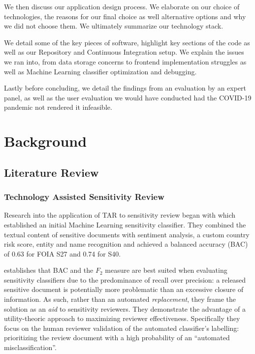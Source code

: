 \documentclass[\version]{l4proj}
\begin{document}
We then discuss our application design process. We elaborate on our choice of technologies, the reasons for our final choice as well alternative options and why we did not choose them. We ultimately summarize our technology stack.

We detail some of the key pieces of software, highlight key sections of the code as well as our Repository and Continuous Integration setup.
We explain the issues we ran into, from data storage concerns to frontend implementation struggles as well as Machine Learning classifier optimization and debugging.

Lastly before concluding, we detail the findings from an evaluation by an expert panel, as well as the user evaluation we would have conducted had the COVID-19 pandemic not rendered it infeasible.


\chapter{Background}

\section{Literature Review}

\subsection{Technology Assisted Sensitivity Review}

\autocite{sanchezDetectingSensitiveInformation2012}

Research into the application of TAR to sensitivity review began with \textcite{mcdonaldClassifierDigitalSensitivity2014} which established an initial Machine Learning sensitivity classifier.
They combined the textual content of sensitive documents with sentiment analysis, a custom country risk score, entity and name recognition and achieved a balanced accuracy (BAC) of 0.63 for FOIA S27 and 0.74 for S40.

\textcite{berardiSemiAutomatedTextClassification2015} establishes that BAC and the \(F_{2}\) measure are best suited when evaluating sensitivity classifiers due to the predominance of recall over precision: a released sensitive document is potentially more problematic than an excessive closure of information.
As such, rather than an automated \textit{replacement}, they frame the solution as an \textit{aid} to sensitivity reviewers.
They demonstrate the advantage of a utility-theoric approach to maximizing reviewer effectiveness.
Specifically they focus on the human reviewer validation of the automated classifier's labelling: prioritizing the review document with a high probability of an ``automated misclassification''.
\end{document}
